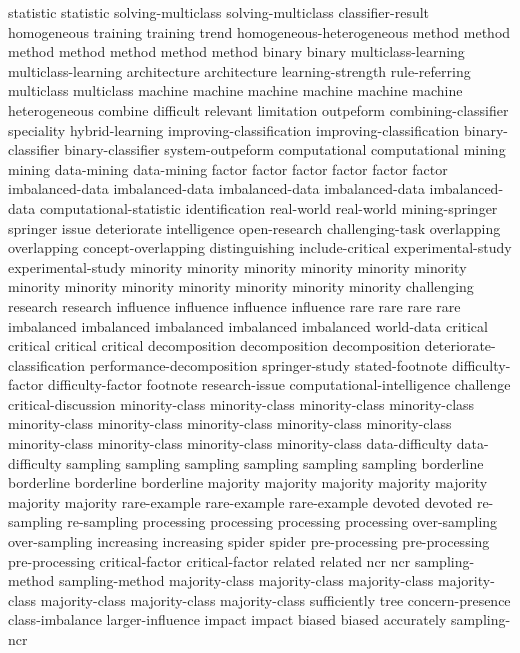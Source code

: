 statistic	statistic	
solving-multiclass	solving-multiclass	
classifier-result	
homogeneous	
training	training	
trend	
homogeneous-heterogeneous	
method	method	method	method	method	method	method	
binary	binary	
multiclass-learning	multiclass-learning	
architecture	architecture	
learning-strength	
rule-referring	
multiclass	multiclass	
machine	machine	machine	machine	machine	machine	
heterogeneous	
combine	
difficult	
relevant	
limitation	
outpeform	
combining-classifier	
speciality	
hybrid-learning	
improving-classification	improving-classification	
binary-classifier	binary-classifier	
system-outpeform	
computational	computational	
mining	mining	
data-mining	data-mining	
factor	factor	factor	factor	factor	factor	
imbalanced-data	imbalanced-data	imbalanced-data	imbalanced-data	imbalanced-data	
computational-statistic	
identification	
real-world	real-world	
mining-springer	
springer	
issue	
deteriorate	
intelligence	
open-research	
challenging-task	
overlapping	overlapping	
concept-overlapping	
distinguishing	
include-critical	
experimental-study	experimental-study	
minority	minority	minority	minority	minority	minority	minority	minority	minority	minority	minority	minority	minority	
challenging	
research	research	
influence	influence	influence	influence	
rare	rare	rare	rare	
imbalanced	imbalanced	imbalanced	imbalanced	imbalanced	
world-data	
critical	critical	critical	critical	
decomposition	decomposition	decomposition	
deteriorate-classification	
performance-decomposition	
springer-study	
stated-footnote	
difficulty-factor	difficulty-factor	
footnote	
research-issue	
computational-intelligence	
challenge	
critical-discussion	
minority-class	minority-class	minority-class	minority-class	minority-class	minority-class	minority-class	minority-class	minority-class	minority-class	minority-class	minority-class	minority-class	
data-difficulty	data-difficulty	
sampling	sampling	sampling	sampling	sampling	sampling	
borderline	borderline	borderline	borderline	
majority	majority	majority	majority	majority	majority	majority	
rare-example	rare-example	rare-example	
devoted	devoted	
re-sampling	re-sampling	
processing	processing	processing	processing	
over-sampling	over-sampling	
increasing	increasing	
spider	spider	
pre-processing	pre-processing	pre-processing	
critical-factor	critical-factor	
related	related	
ncr	ncr	
sampling-method	sampling-method	
majority-class	majority-class	majority-class	majority-class	majority-class	majority-class	majority-class	
sufficiently	
tree	
concern-presence	
class-imbalance	
larger-influence	
impact	impact	
biased	biased	
accurately	
sampling-ncr	
